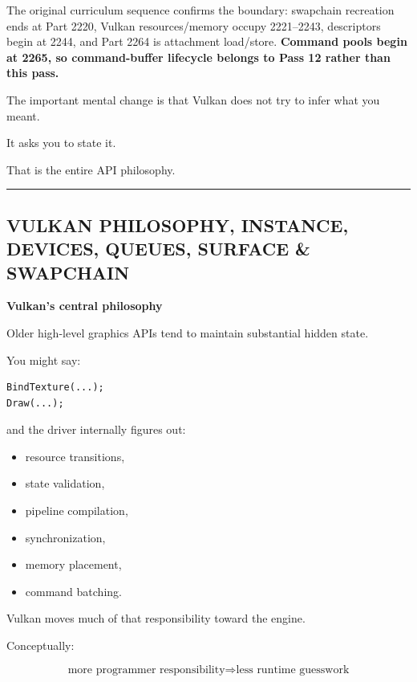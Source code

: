 The original curriculum sequence confirms the boundary: swapchain recreation ends at Part 2220, Vulkan resources/memory occupy 2221--2243, descriptors begin at 2244, and Part 2264 is attachment load/store. \textbf{Command pools begin at 2265, so command-buffer lifecycle belongs to Pass 12 rather than this pass.}

The important mental change is that Vulkan does not try to infer what you meant.

It asks you to state it.

That is the entire API philosophy.

\begin{center}\rule{0.5\linewidth}{0.5pt}\end{center}

\subsection{VULKAN PHILOSOPHY, INSTANCE, DEVICES, QUEUES, SURFACE \& SWAPCHAIN}\label{05-engine-i-ch020-vulkan-philosophy-instance-devices-queues-surface-swapchain}

\hypertarget{05-engine-i-ch020-vulkan-philosophy-instance-devices-queues-surface-swapchain}{}

\textbf{Vulkan's central philosophy}

Older high-level graphics APIs tend to maintain substantial hidden state.

You might say:

\begin{verbatim}
BindTexture(...);
Draw(...);
\end{verbatim}

and the driver internally figures out:

\begin{itemize}
\tightlist
\item
  resource transitions,
\item
  state validation,
\item
  pipeline compilation,
\item
  synchronization,
\item
  memory placement,
\item
  command batching.
\end{itemize}

Vulkan moves much of that responsibility toward the engine.

Conceptually:

\[
\boxed{
\text{more programmer responsibility}
\Longrightarrow
\text{less runtime guesswork}
}
\]


